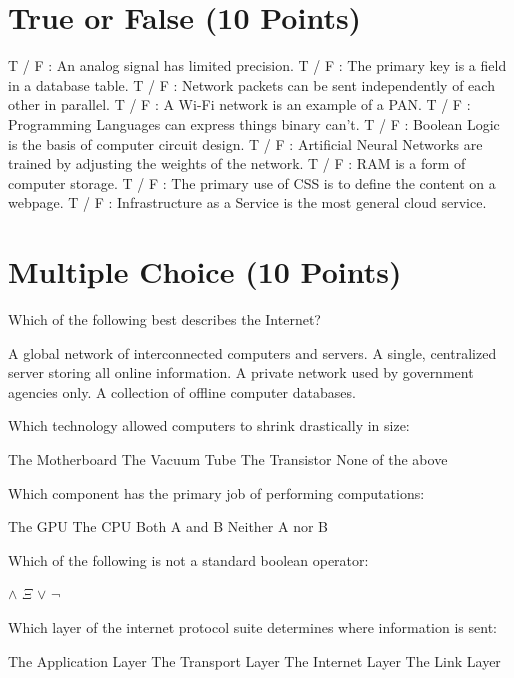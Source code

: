 \documentclass{exam}
\begin{document}
\begin{questions}
\section{True or False (10 Points)}
\question[1] T / F : An analog signal has limited precision.
\question[1] T / F : The primary key is a field in a database table.
\question[1] T / F : Network packets can be sent independently of each other in parallel.
\question[1] T / F : A Wi-Fi network is an example of a PAN.
\question[1] T / F : Programming Languages can express things binary can't.
\question[1] T / F : Boolean Logic is the basis of computer circuit design.
\question[1] T / F : Artificial Neural Networks are trained by adjusting the weights of the network.
\question[1] T / F : RAM is a form of computer storage.
\question[1] T / F : The primary use of CSS is to define the content on a webpage.
\question[1] T / F : Infrastructure as a Service is the most general cloud service.

\section{Multiple Choice (10 Points)}
\question[1] Which of the following best describes the Internet?
\begin{choices}
    \choice A global network of interconnected computers and servers.
    \choice A single, centralized server storing all online information.
    \choice A private network used by government agencies only.
    \choice A collection of offline computer databases.
\end{choices}
\question[1] Which technology allowed computers to shrink drastically in size:
\begin{choices}
    \choice The Motherboard
    \choice The Vacuum Tube
    \choice The Transistor
    \choice None of the above
\end{choices}
\question[1] Which component has the primary job of performing computations:
\begin{choices}
    \choice The GPU
    \choice The CPU
    \choice Both A and B
    \choice Neither A nor B
\end{choices}
\question[1] Which of the following is not a standard boolean operator:
\begin{choices}
    \choice $\land$
    \choice $\Xi$
    \choice $\lor$
    \choice $\lnot$ 
\end{choices}

\newpage
\question[1] Which layer of the internet protocol suite determines where information is sent:
\begin{choices}
    \choice The Application Layer
    \choice The Transport Layer
    \choice The Internet Layer
    \choice The Link Layer
\end{choices}


\end{questions}
\end{document}
